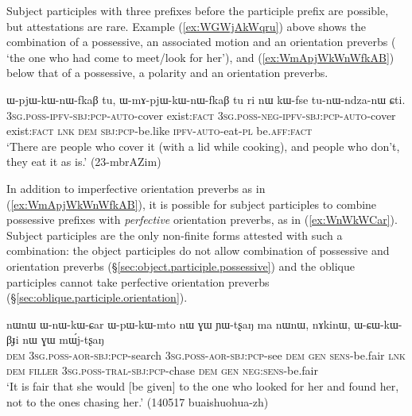 Subject participles with three prefixes before the participle prefix  are possible, but attestations are rare. Example (\ref{ex:WGWjAkWqru}) above shows the combination of a possessive, an associated motion and an orientation preverbs ( `the one who had come to meet/look for her'), and (\ref{ex:WmApjWkWnWfkAB}) below that of a possessive, a polarity and an orientation preverbs.

\begin{exe}
\ex \label{ex:WmApjWkWnWfkAB}
 \gll ɯ-pjɯ-kɯ-nɯ-fkaβ tu, ɯ-mɤ-pjɯ-kɯ-nɯ-fkaβ tu ri nɯ kɯ-fse tu-nɯ-ndza-nɯ ɕti. \\
 \textsc{3sg}.\textsc{poss}-\textsc{ipfv}-\textsc{sbj}:\textsc{pcp}-\textsc{auto}-cover exist:\textsc{fact}  \textsc{3sg}.\textsc{poss}-\textsc{neg}-\textsc{ipfv}-\textsc{sbj}:\textsc{pcp}-\textsc{auto}-cover exist:\textsc{fact} \textsc{lnk} \textsc{dem} \textsc{sbj}:\textsc{pcp}-be.like \textsc{ipfv}-\textsc{auto}-eat-\textsc{pl} be.\textsc{aff}:\textsc{fact} \\
 \glt `There are people who cover it (with a lid while cooking), and people who don't, they eat it as is.' (23-mbrAZim)
\end{exe}

In addition to imperfective orientation preverbs as in (\ref{ex:WmApjWkWnWfkAB}), it is possible for subject participles to combine possessive prefixes with \textit{perfective} orientation preverbs, as in (\ref{ex:WnWkWCar}). Subject participles are the only non-finite forms attested with such a combination: the object participles do not allow combination of possessive and orientation preverbs (§\ref{sec:object.participle.possessive}) and the oblique participles cannot take perfective orientation preverbs (§\ref{sec:oblique.participle.orientation}).

 \begin{exe} 
\ex \label{ex:WnWkWCar}
\gll nɯnɯ ɯ-nɯ-kɯ-ɕar ɯ-pɯ-kɯ-mto nɯ ɣɯ ɲɯ-tʂaŋ ma nɯnɯ, nɤkinɯ, ɯ-ɕɯ-kɯ-βɟi nɯ ɣɯ mɯ́j-tʂaŋ \\
\textsc{dem} \textsc{3sg}.\textsc{poss}-\textsc{aor}-\textsc{sbj}:\textsc{pcp}-search \textsc{3sg}.\textsc{poss}-\textsc{aor}-\textsc{sbj}:\textsc{pcp}-see \textsc{dem} \textsc{gen} \textsc{sens}-be.fair \textsc{lnk} \textsc{dem} \textsc{filler} \textsc{3sg}.\textsc{poss}-\textsc{tral}-\textsc{sbj}:\textsc{pcp}-chase \textsc{dem} \textsc{gen} \textsc{neg}:\textsc{sens}-be.fair \\
\glt `It is fair that she would [be given] to the one who looked for her and found her, not to the ones chasing her.' (140517 buaishuohua-zh)
\end{exe}

